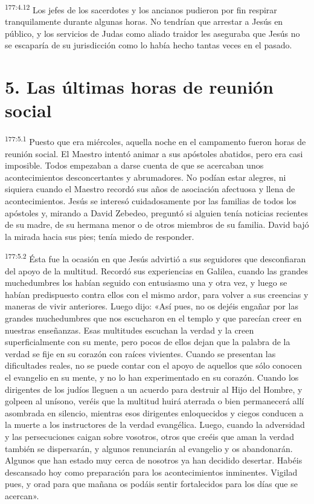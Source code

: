 \par 
\textsuperscript{177:4.12} Los jefes de los sacerdotes y los ancianos pudieron por fin respirar tranquilamente durante algunas horas. No tendrían que arrestar a Jesús en público, y los servicios de Judas como aliado traidor les aseguraba que Jesús no se escaparía de su jurisdicción como lo había hecho tantas veces en el pasado.

\section*{5. Las últimas horas de reunión social}
\par 
\textsuperscript{177:5.1} Puesto que era miércoles, aquella noche en el campamento fueron horas de reunión social. El Maestro intentó animar a sus apóstoles abatidos, pero era casi imposible. Todos empezaban a darse cuenta de que se acercaban unos acontecimientos desconcertantes y abrumadores. No podían estar alegres, ni siquiera cuando el Maestro recordó sus años de asociación afectuosa y llena de acontecimientos. Jesús se interesó cuidadosamente por las familias de todos los apóstoles y, mirando a David Zebedeo, preguntó si alguien tenía noticias recientes de su madre, de su hermana menor o de otros miembros de su familia. David bajó la mirada hacia sus pies; tenía miedo de responder.

\par 
\textsuperscript{177:5.2} Ésta fue la ocasión en que Jesús advirtió a sus seguidores que desconfiaran del apoyo de la multitud. Recordó sus experiencias en Galilea, cuando las grandes muchedumbres los habían seguido con entusiasmo una y otra vez, y luego se habían predispuesto contra ellos con el mismo ardor, para volver a sus creencias y maneras de vivir anteriores. Luego dijo: «Así pues, no os dejéis engañar por las grandes muchedumbres que nos escucharon en el templo y que parecían creer en nuestras enseñanzas. Esas multitudes escuchan la verdad y la creen superficialmente con su mente, pero pocos de ellos dejan que la palabra de la verdad se fije en su corazón con raíces vivientes. Cuando se presentan las dificultades reales, no se puede contar con el apoyo de aquellos que sólo conocen el evangelio en su mente, y no lo han experimentado en su corazón. Cuando los dirigentes de los judíos lleguen a un acuerdo para destruir al Hijo del Hombre, y golpeen al unísono, veréis que la multitud huirá aterrada o bien permanecerá allí asombrada en silencio, mientras esos dirigentes enloquecidos y ciegos conducen a la muerte a los instructores de la verdad evangélica. Luego, cuando la adversidad y las persecuciones caigan sobre vosotros, otros que creéis que aman la verdad también se dispersarán, y algunos renunciarán al evangelio y os abandonarán. Algunos que han estado muy cerca de nosotros ya han decidido desertar. Habéis descansado hoy como preparación para los acontecimientos inminentes. Vigilad pues, y orad para que mañana os podáis sentir fortalecidos para los días que se acercan».

